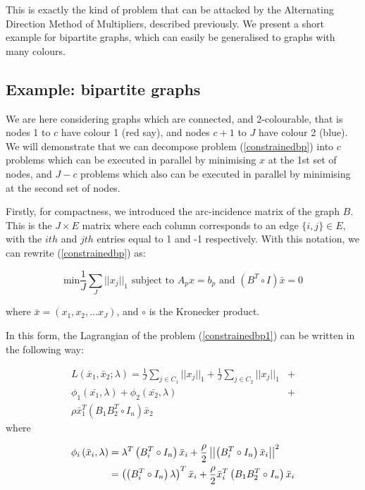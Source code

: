 \documentclass{article}
\begin{document}
This is exactly the kind of problem that can be attacked by the Alternating Direction Method of Multipliers, described previously. We present a short example for bipartite graphs, which can easily be generalised to graphs with many colours. 
 
\subsection{Example: bipartite graphs}
We are here considering graphs which are connected, and 2-colourable, that is nodes 1 to \(c\) have colour 1 (red say), and nodes \(c+1\) to \(J\) have colour 2 (blue). We will demonstrate that we can decompose problem (\ref{constrainedbp}) into \(c\) problems which can be executed in parallel by minimising \(x\) at the 1st set of nodes, and \(J - c\) problems which also can be executed in parallel by minimising at the second set of nodes. 

Firstly, for compactness, we introduced the arc-incidence matrix of the graph \(B\). This is the \(J \times E\) matrix where each column corresponds to an edge \(\{i,j\} \in E\), with the \(ith\) and \(jth\) entries equal to 1 and -1 respectively. With this notation, we can rewrite (\ref{constrainedbp}) as:

\begin{equation}
\text{min} \frac{1}{J}\sum_J||x_j||_1 \text{ subject to } A_p x = b_p \text{ and } \left(B^T \circ I \right)\bar{x} = 0 
 \label{constrainedbp1}
\end{equation}

where \(\bar{x} = \left(x_1, x_2, \ldots x_J \right)\), and \(\circ\) is the Kronecker product. 

In this form, the Lagrangian of the problem (\ref{constrainedbp1}) can be written in the following way:

\begin{align}
L\left(\bar{x}_1, \bar{x}_2; \lambda\right) = \frac{1}{J}\sum_{j \in C_1}||x_j||_1 + \frac{1}{J}\sum_{j \in C_2}||x_j||_1 &+ \\ \phi_1\left(\bar{x_1}, \lambda\right) + \phi_2\left(\bar{x_2}, \lambda\right) &+ \\
\rho\bar{x}_1^T\left(B_1B_2^T\circ I_n\right)\bar{x}_2
\end{align}
where 

\begin{align}
\phi_i\left(\bar{x}_i, \lambda\right) &= \lambda^T\left(B_i^T\circ I_n\right)\bar{x}_i + \frac{\rho}{2}\left|\left|\left(B_i^T\circ I_n\right)\bar{x}_i \right|\right|^2 \\
&= \left(\left(B_i^T\circ I_n\right)\lambda \right)^T\bar{x}_i + \frac{\rho}{2}\bar{x}_i^T\left(B_1B_2^T\circ I_n\right)\bar{x}_i
\end{align}
\end{document}
